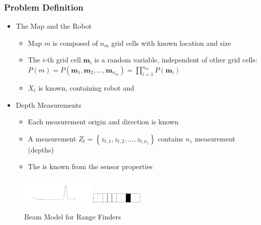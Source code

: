 \documentclass[11pt,professionalfonts,hyperref={pdftex,pdfpagemode=none,pdfstartview=FitH}]{beamer}
\newcommand{\braces}[1]{\ensuremath{\left\{ #1 \right\}}}
\renewcommand{\emph}[1]{\textit{\textbf{\color{blue}{#1}}}}
\begin{document}
\begin{frame}
\frametitle{Problem Definition}

\begin{itemize}
	\item The Map and the Robot
	\begin{itemize}
	\item Map $m$ is composed of $n_m$ grid cells with known location and size
	\item The $i$-th grid cell $\mathbf{m}_i$ is a \emph{static binary} random variable, independent of other grid cells: $P(m)=P(\mathbf{m}_1,\mathbf{m}_2,\ldots,\mathbf{m}_{n_m})=\prod_{i=1}^{n_m}P(\mathbf{m}_i)$
	\item \emph{Pose} $X_t$ is known, containing robot \emph{position} and \emph{attitude}
	\end{itemize}
\vspace*{0.0cm}\pause
\end{itemize}
\begin{minipage}[t]{7.0cm}
\begin{itemize}
	\item Depth Measurements
	\begin{itemize}
	\item Each measurement origin and direction is known \emph{deterministically}
	\item A measurement \emph{scan} $Z_t=\braces{z_{t,1},z_{t,2},\ldots,z_{t,n_z}}$ contains $n_z$ measurement \emph{rays} (depths)%
\item The \emph{forward sensor model} is known from the sensor properties
\end{itemize}
\end{itemize}
\end{minipage}
\begin{minipage}[t]{3.0cm}
\hspace*{0.25cm}
\begin{figure}[!htbp]
\vspace*{-0.25cm}
\centerline{
    \includegraphics[width=3.5cm]{BeamModel.png}\hspace*{0.1cm}
    }
\vspace*{0.25cm}
\centerline{
    \includegraphics[width=2.5cm]{1D_True_Grid.png}\hspace*{0.1cm}
    }
{Beam Model for Range Finders}
\end{figure}

\end{minipage}



\end{frame}
\end{document}
